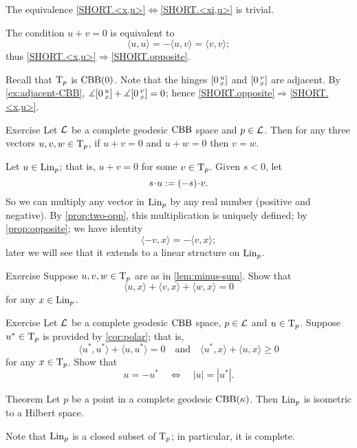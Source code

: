 The equivalence  \ref{SHORT.<x,u>}$\Leftrightarrow$\ref{SHORT.<xi,u>} is trivial.

The condition $u+v=0$ is equivalent to 
\[\langle u,u\rangle =-\langle u,v\rangle =\langle v,v\rangle ;\]
thus 
\ref{SHORT.<x,u>}$\Rightarrow$\ref{SHORT.opposite}.

Recall that $\mathrm{T}_p$ is $\mathrm{CBB}(0)$.
Note that the hinges $[0\,{}^{u}_{x}]$ and $[0\,{}^{v}_{x}]$ are adjacent.
By \ref{ex:adjacent-CBB}, $\measuredangle[0\,{}^{u}_{x}]+\measuredangle[0\,{}^{v}_{x}]=0$;
hence \ref{SHORT.opposite}$\Rightarrow$\ref{SHORT.<x,u>}.
\qeds

\begin{thm}{Exercise}\label{prop:two-opp}
Let $\mathcal{L}$  be a complete geodesic $\mathrm{CBB}$ space and $p\in \mathcal{L}$.
Then for any three vectors $u,v,w\in\mathrm{T}_p$, if $u+v=0$ and $u+ w=0$ then $v=w$.
\end{thm}

Let $u\in \mathop{\rm Lin}\nolimits_p$; that is, $u+v=0$ for some $v\in\mathrm{T}_p$.
Given $s<0$, let 
\[s\cdot u\df (-s)\cdot v.\]
So we can multiply any vector in $\mathop{\rm Lin}\nolimits_p$ by any real number (positive and negative).
By \ref{prop:two-opp}, this multiplication is uniquely defined;
by \ref{prop:opposite}; we have identity
\[\langle -v,x\rangle=-\langle v,x\rangle;\]
later we will see that it extends to a linear structure on $\mathop{\rm Lin}\nolimits_p$.

\begin{thm}{Exercise}\label{ex:3<,>=0}
Suppose $u,v,w\in\mathrm{T}_p$ are as in \ref{lem:minus-sum}.
Show that
\[\langle u,x\rangle +\langle v,x\rangle +\langle w,x\rangle = 0\]
for any $x\in \mathop{\rm Lin}\nolimits_p$.
\end{thm}

\begin{thm}{Exercise}\label{ex:-u}
Let $\mathcal{L}$ be a complete geodesic $\mathrm{CBB}$ space,
$p\in \mathcal{L}$ and $u\in \mathrm{T}_p$.
Suppose $u^*\in \mathrm{T}_p$ is provided by \ref{cor:polar};
that is, 
\[\langle u^*,u^*\rangle +\langle u,u^*\rangle = 0
\quad\text{and}\quad
\langle u^*,x\rangle +\langle u,x\rangle \ge 0
\]
for any $x\in \mathrm{T}_p$.
Show that 
\[u=-u^*\quad\Longleftrightarrow\quad|u|=|u^*|.\]
\end{thm}


\begin{thm}{Theorem}\label{thm:lin-subcone}
Let $p$ be a point in a complete geodesic $\mathrm{CBB}(\kappa)$. 
Then $\mathop{\rm Lin}\nolimits_p$ is isometric to a Hilbert space.
\end{thm}

Note that $\mathop{\rm Lin}\nolimits_p$ is a closed subset of $\mathrm{T}_p$;
in particular, it is complete.

